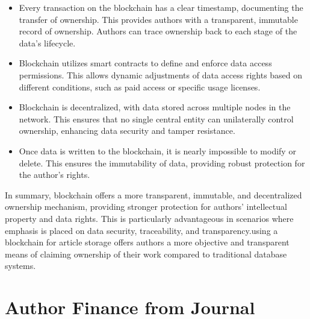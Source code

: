 \documentclass[lettersize,journal]{IEEEtran}
\begin{document}
\begin{itemize}
  \item Every transaction on the blockchain has a clear timestamp, documenting the transfer of ownership. This provides authors with a transparent, immutable record of ownership. Authors can trace ownership back to each stage of the data's lifecycle.

  \item Blockchain utilizes smart contracts to define and enforce data access permissions. This allows dynamic adjustments of data access rights based on different conditions, such as paid access or specific usage licenses.

  \item Blockchain is decentralized, with data stored across multiple nodes in the network. This ensures that no single central entity can unilaterally control ownership, enhancing data security and tamper resistance.

  \item Once data is written to the blockchain, it is nearly impossible to modify or delete. This ensures the immutability of data, providing robust protection for the author's rights.
\end{itemize}
In summary, blockchain offers a more transparent, immutable, and decentralized ownership mechanism, providing stronger protection for authors' intellectual property and data rights. This is particularly advantageous in scenarios where emphasis is placed on data security, traceability, and transparency.using a blockchain for article storage offers authors a more objective and transparent means of claiming ownership of their work compared to traditional database systems.

\section{Author Finance from Journal}
\end{document}
